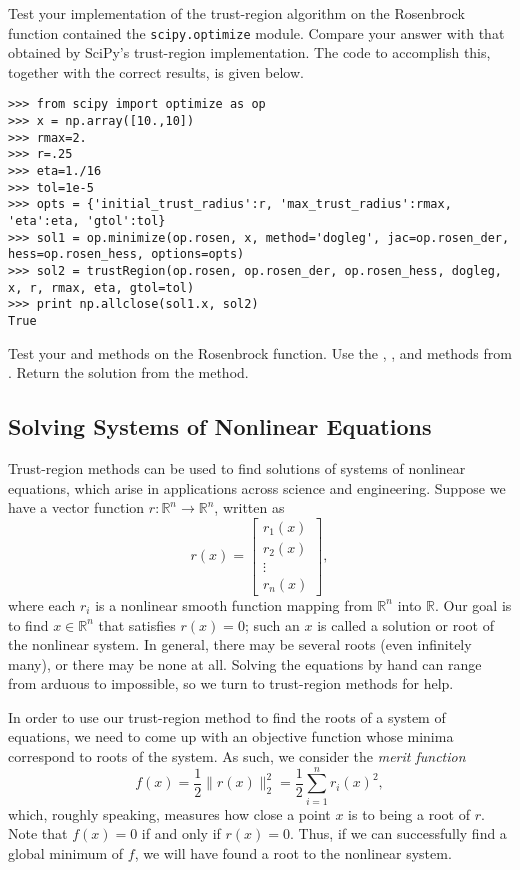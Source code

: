 Test your implementation of the trust-region algorithm on the Rosenbrock function contained the {\tt scipy.optimize} module.
Compare your answer with that obtained by SciPy's trust-region implementation. The code to accomplish this, together with the
correct results, is given below.
\begin{lstlisting}
>>> from scipy import optimize as op
>>> x = np.array([10.,10])
>>> rmax=2.
>>> r=.25
>>> eta=1./16
>>> tol=1e-5
>>> opts = {'initial_trust_radius':r, 'max_trust_radius':rmax, 'eta':eta, 'gtol':tol}
>>> sol1 = op.minimize(op.rosen, x, method='dogleg', jac=op.rosen_der, hess=op.rosen_hess, options=opts)
>>> sol2 = trustRegion(op.rosen, op.rosen_der, op.rosen_hess, dogleg, x, r, rmax, eta, gtol=tol)
>>> print np.allclose(sol1.x, sol2)
True
\end{lstlisting}
\begin{problem}
Test your  and  methods on the Rosenbrock function.  Use the , , and  methods from .  Return the solution  from the  method.
\end{problem}

\subsection*{Solving Systems of Nonlinear Equations}
Trust-region methods can be used to find solutions of systems of nonlinear equations, which arise in applications across science and engineering.
Suppose we have a vector function $r : \mathbb{R}^n \rightarrow \mathbb{R}^n$, written as
\[
r(x) = \begin{bmatrix}
r_1(x)\\
r_2(x)\\
\vdots\\
r_n(x)
\end{bmatrix},
\]
where each $r_i$ is a nonlinear smooth function mapping from $\mathbb{R}^n$ into $\mathbb{R}$.
Our goal is to find $x \in \mathbb{R}^n$ that satisfies $r(x) = 0$; such an $x$ is called a solution
or root of the nonlinear system. In general, there may be several roots (even infinitely many), or there
may be none at all. Solving the equations by hand can range from arduous to impossible, so we turn
to trust-region methods for help.

In order to use our trust-region method to find the roots of a system
of equations, we need to come up with an objective function whose minima correspond to roots of the
system. As such, we consider the \emph{merit function}
\[
f(x) = \frac{1}{2}\|r(x)\|_2^2 = \frac{1}{2}\sum_{i=1}^nr_i(x)^2,
\]
which, roughly speaking, measures how close a point $x$ is to being a root of $r$. Note that $f(x) = 0$
if and only if $r(x) = 0$. Thus, if we can successfully find a global minimum of $f$, we will have
found a root to the nonlinear system.

